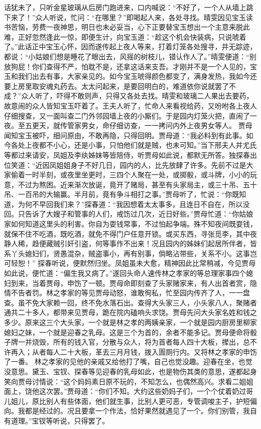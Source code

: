 \documentclass[12pt,oneside]{book}
\begin{document}
话犹未了，只听金星玻璃从后房门跑进来，口内喊说：“不好了，一个人从墙上跳下来了！”众人听说，忙问：“在哪里？”即喝起人来，各处寻找。晴雯因见宝玉读书苦恼，劳费一夜神思，明日也未必妥当，心下正要替宝玉想出一个主意来脱此难，正好忽然逢此一惊，即便生计，向宝玉道：“趁这个机会快装病，只说唬着了。”此话正中宝玉心怀，因而遂传起上夜人等来，打着灯笼各处搜寻，并无踪迹，都说：“小姑娘们想是睡花了眼出去，风摇的树枝儿，错认作人了。”晴雯便道：“别放狗屁！你们查得不严，怕耽不是，还拿这话来支吾。才刚并不是一个人见的，宝玉和我们出去有事，大家亲见的。如今宝玉唬得颜色都变了，满身发热，我如今还要上房里取安魂丸药去。太太问起来，是要回明白的，难道依你说就罢了不成？”众人听了，吓得不敢则声，只得又各处去找。晴雯和玻璃二人果出去要药，故意闹的众人皆知宝玉吓着了。王夫人听了，忙命人来看视给药，又吩咐各上夜人仔细搜查，又一面叫查二门外邻园墙上夜的小厮们。于是园内灯笼火把，直闹了一夜。至五更天，就传管家男女，命仔细访查，一一拷问内外上夜男女等人。
贾母闻知宝玉被吓，细问原由，不敢再隐，只得回明。贾母道：“我必料到有此事。如今各处上夜都不小心，还是小事，只怕他们就是贼，也未可知。”当下邢夫人并尤氏等都过来请安，凤姐及李纨姊妹等皆陪侍，听贾母如此说，都默无所答。独探春出位笑道：“近因凤姐姐身子不好几日，园内的人，比先放肆了许多。先前不过是大家偷着一时半刻，或夜里坐更时，三四个人聚在一处，或掷骰，或斗牌，小小的玩意，不过为熬困。近来渐次放诞，竟开了赌局，甚至有头家局主，或三十吊、五十吊、一百吊的大输赢。半月前，竟有争斗相打之事。”贾母听了，忙说：“你既知道，为何不早回我们来？”探春道：“我因想着太太事多，且连日不自在，所以没回。只告诉了大嫂子和管事的人们，戒饬过几次，近日好些。”贾母忙道：“你姑娘家如何知道这里头的利害。你自为耍钱常事，不过怕起争端。殊不知夜间既耍钱，就保不住不吃酒，既吃酒，就免不得门户任意开锁。或买东西，寻张觅李，其中夜静人稀，趋便藏贼引奸引盗，何等事作不出来！况且园内的姊妹们起居所伴者，皆系丫头媳妇们，贤愚混杂，贼盗事小，再有别事，倘略沾带些，关系不小。这事岂可轻恕！”
探春听说，便默然归坐。凤姐虽未大愈，精神因此比常稍减，今见贾母如此说，便忙道：“偏生我又病了。”遂回头命人速传林之孝家的等总理家事四个媳妇到来，当着贾母，申饬了一顿。贾母命即刻查了头家赌家来，有人出首者赏，隐情不告者罚。林之孝家的等见贾母动怒，谁敢徇私，忙至园内传齐了人，一一盘查。虽不免大家赖一回，终不免水落石出。查得大头家三人，小头家八人，聚赌者通共二十多人，都带来见贾母，跪在院内磕响头求饶。贾母先问大头家名姓和钱之多少。原来这三个大头家，一个就是林之孝的两姨亲家，一个就是园内厨房里柳家媳妇之妹，一个就是迎春之乳母。这是三个为首的，余者不能多记。贾母便命将骰子牌一并烧毁，所有的钱入官，分散与众人，将为首者每人四十大板，撵出，总不许再入；从者每人二十大板，革去三月月钱，拨入圊厕行内。又将林之孝家的申饬了一番。
林之孝家的见他的亲戚又给他打了嘴，自己也觉没趣。迎春在坐，也觉没意思。黛玉、宝钗、探春等见迎春的乳母如此，也是物伤其类的意思，遂都起身笑向贾母讨情说：“这个妈妈素日原不玩的，不知怎么，也偶然高兴。求看二姐姐面上，饶他这次罢。”贾母道：“你们不知。大约这些奶妈子们，一个个仗着奶过哥儿姐儿，原比别人有些体面，他们就生事，比别人更可恶，专管调唆主子，护短偏向。我都是经过的。况且要拿一个作法，恰好果然就遇见了一个。你们别管，我自有道理。”宝钗等听说，只得罢了。
\end{document}
